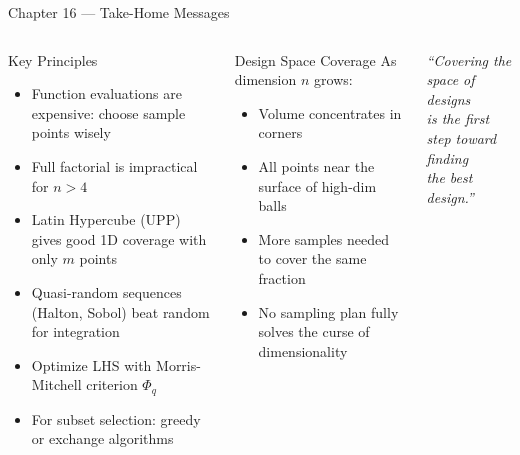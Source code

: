 \documentclass[aspectratio=169,10pt]{beamer}
\begin{document}
\begin{frame}{Chapter 16 --- Take-Home Messages}
  \begin{columns}
    \begin{block}{Key Principles}
      \begin{itemize}
        \item Function evaluations are expensive: choose sample points wisely
        \item Full factorial is impractical for $n > 4$
        \item Latin Hypercube (UPP) gives good 1D coverage with only $m$ points
        \item Quasi-random sequences (Halton, Sobol) beat random for integration
        \item Optimize LHS with Morris-Mitchell criterion $\Phi_q$
        \item For subset selection: greedy or exchange algorithms
      \end{itemize}
    \end{block}

    \begin{alertblock}{Design Space Coverage}
      As dimension $n$ grows:
      \begin{itemize}
        \item Volume concentrates in corners
        \item All points near the surface of high-dim balls
        \item More samples needed to cover the same fraction
        \item No sampling plan fully solves the curse of dimensionality
      \end{itemize}
    \end{alertblock}
    \vspace{0.4em}
    \begin{center}
      \large\textit{``Covering the space of designs\\
        is the first step toward finding\\
        the best design.''}
    \end{center}
  \end{columns}
\end{frame}
\end{document}
